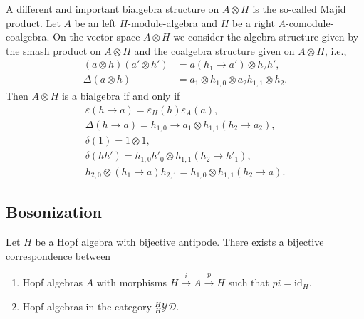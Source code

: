 \begin{remark}
A different and important bialgebra structure on $A\otimes H$ is
the so-called \underline{Majid product}. Let $A$ be an left $H$-module-algebra
and $H$ be a right $A$-comodule-coalgebra. On the vector space $A\otimes H$
we consider the algebra structure given by the smash product on $A\otimes H$ and the coalgebra
structure given on $A\otimes H$, i.e.,
\begin{align*}
(a\otimes h)(a'\otimes h') & =a(h_{1}\rightarrow a')\otimes h_{2}h',\\
\Delta(a\otimes h) & =a_{1}\otimes h_{1,0}\otimes a_{2}h_{1,1}\otimes h_{2}.\end{align*}
Then $A\otimes H$ is a bialgebra if and only if \begin{gather*}
\varepsilon(h\rightarrow a)=\varepsilon_{H}(h)\varepsilon_{A}(a),\\
\Delta(h\rightarrow a)=h_{1,0}\rightarrow a_{1}\otimes h_{1,1}(h_{2}\rightarrow a_{2}),\\
\delta(1)=1\otimes1,\\
\delta(hh')=h_{1,0}h'_{0}\otimes h_{1,1}(h_{2}\rightarrow h'_{1}),\\
h_{2,0}\otimes(h_{1}\rightarrow a)h_{2,1}=h_{1,0}\otimes h_{1,1}(h_{2}\rightarrow a).
\end{gather*}
\end{remark}

\subsection{Bosonization}

\begin{theorem}
\label{theorem:bosonization}
Let $H$ be a Hopf algebra with bijective antipode. There exists a bijective
correspondence between
\begin{enumerate}
\item Hopf algebras $A$ with morphisms $H\xrightarrow{i}A\xrightarrow{p}H$
such that $pi=\textrm{id}_{H}$.
\item Hopf algebras in the category $_{H}^{H}\mathcal{YD}$.
\end{enumerate}
\end{theorem}

